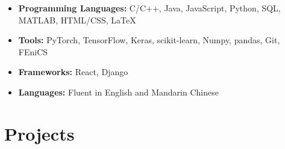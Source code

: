 \documentclass[letterpaper,11pt]{article}
\newcommand{\myitem}[1]{\item #1 \vspace{-8pt}}
\newcommand{\mysubitem}[1]{\item #1 \vspace{-4pt}}
\begin{document}
\begin{itemize}[leftmargin=*]
	\myitem {\textbf{Programming Languages:} C/C++, Java, JavaScript, Python, SQL, MATLAB, HTML/CSS, \LaTeX}
	\myitem {\textbf{Tools:} PyTorch, TensorFlow, Keras, scikit-learn, Numpy, pandas, Git, FEniCS}
	\myitem{\textbf{Frameworks:} React, Django}
	\myitem {\textbf{Languages:} Fluent in English and Mandarin Chinese}
\end{itemize}

\vspace{0pt}

\section{Projects}
\end{document}
